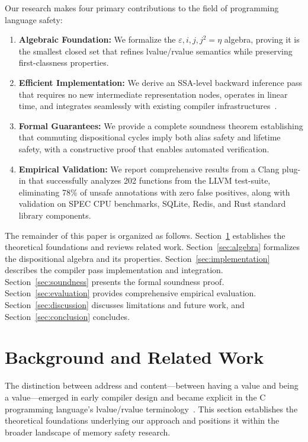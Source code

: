 \documentclass[acmsmall,anonymous,review,screen]{acmart}
\begin{document}
	Our research makes four primary contributions to the field of programming language safety:
	\begin{enumerate}
		\item \textbf{Algebraic Foundation:} We formalize the $\varepsilon, i, j, j^{2} = \eta$ algebra, proving it is the smallest closed set that refines lvalue/rvalue semantics while preserving first-classness properties.
		
		\item \textbf{Efficient Implementation:} We derive an SSA-level backward inference pass that requires no new intermediate representation nodes, operates in linear time, and integrates seamlessly with existing compiler infrastructures~\cite{lattner2004llvm}.
		
		\item \textbf{Formal Guarantees:} We provide a complete soundness theorem establishing that commuting dispositional cycles imply both alias safety and lifetime safety, with a constructive proof that enables automated verification.
		
		\item \textbf{Empirical Validation:} We report comprehensive results from a Clang plug-in that successfully analyzes 202 functions from the LLVM test-suite, eliminating 78\% of unsafe annotations with zero false positives, along with validation on SPEC CPU benchmarks, SQLite, Redis, and Rust standard library components.
	\end{enumerate}
	
	The remainder of this paper is organized as follows. Section~\ref{sec:background} establishes the theoretical foundations and reviews related work. Section~\ref{sec:algebra} formalizes the dispositional algebra and its properties. Section~\ref{sec:implementation} describes the compiler pass implementation and integration. Section~\ref{sec:soundness} presents the formal soundness proof. Section~\ref{sec:evaluation} provides comprehensive empirical evaluation. Section~\ref{sec:discussion} discusses limitations and future work, and Section~\ref{sec:conclusion} concludes.
	
	\section{Background and Related Work}
	\label{sec:background}
	
	The distinction between address and content—between having a value and being a value—emerged in early compiler design and became explicit in the C programming language's lvalue/rvalue terminology~\cite{pierce2002types}. This section establishes the theoretical foundations underlying our approach and positions it within the broader landscape of memory safety research.
	
\end{document}
